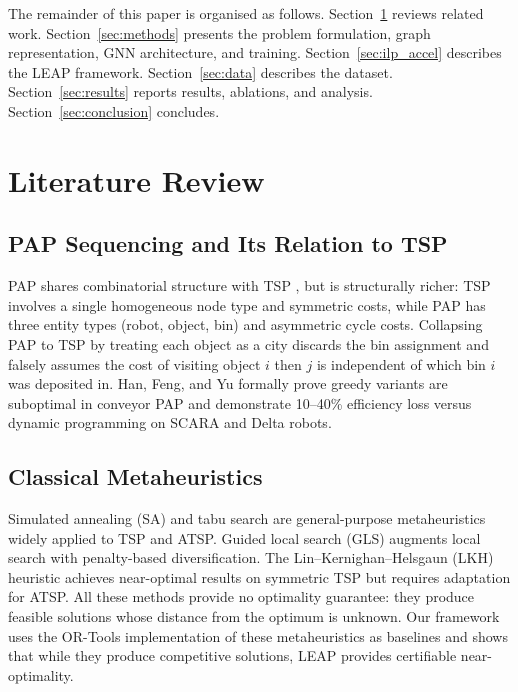 \documentclass[conference]{IEEEtran}
\begin{document}
The remainder of this paper is organised as follows. Section~\ref{sec:lit} reviews related work. Section~\ref{sec:methods} presents the problem formulation, graph representation, GNN architecture, and training. Section~\ref{sec:ilp_accel} describes the LEAP framework. Section~\ref{sec:data} describes the dataset. Section~\ref{sec:results} reports results, ablations, and analysis. Section~\ref{sec:conclusion} concludes.

\section{Literature Review}\label{sec:lit}

\subsection{PAP Sequencing and Its Relation to TSP}

PAP shares combinatorial structure with TSP \cite{dantzig1954}, but is structurally richer: TSP involves a single homogeneous node type and symmetric costs, while PAP has three entity types (robot, object, bin) and asymmetric cycle costs. Collapsing PAP to TSP by treating each object as a city discards the bin assignment and falsely assumes the cost of visiting object $i$ then $j$ is independent of which bin $i$ was deposited in. Han, Feng, and Yu \cite{han2019pap} formally prove greedy variants are suboptimal in conveyor PAP and demonstrate 10--40\% efficiency loss versus dynamic programming on SCARA and Delta robots.

\subsection{Classical Metaheuristics}

Simulated annealing (SA) \cite{kirkpatrick1983sa} and tabu search \cite{glover1989tabu} are general-purpose metaheuristics widely applied to TSP and ATSP. Guided local search (GLS) \cite{voudouris1999gls} augments local search with penalty-based diversification. The Lin--Kernighan--Helsgaun (LKH) heuristic \cite{helsgaun2000lkh} achieves near-optimal results on symmetric TSP but requires adaptation for ATSP. All these methods provide no optimality guarantee: they produce feasible solutions whose distance from the optimum is unknown. Our framework uses the OR-Tools implementation \cite{ortools} of these metaheuristics as baselines and shows that while they produce competitive solutions, LEAP provides certifiable near-optimality.
\end{document}
